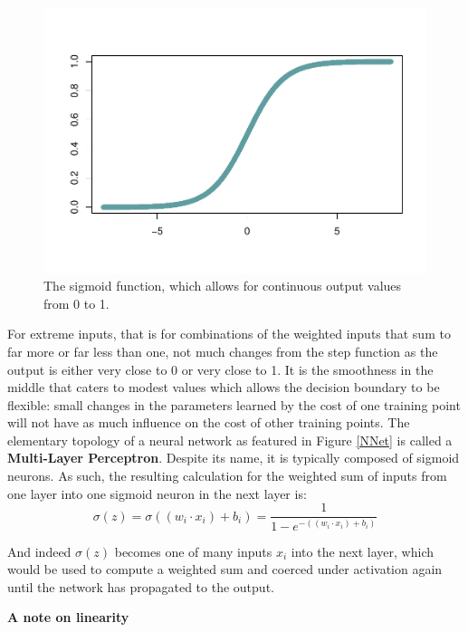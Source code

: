 \begin{figure}[H]
    \centering
   \vspace{-40pt}
    \includegraphics[width = .7\textwidth]{Figures/sigmoid-function-1.pdf}
   \vspace{-40pt}
    \caption{\footnotesize The sigmoid function, which allows for continuous output values from 0 to 1.}
\end{figure}

For extreme inputs, that is for combinations of the weighted inputs that sum to far more or far less than one, not much changes from the step function as the output is either very close to 0 or very close to 1.  It is the smoothness in the middle that caters to modest values which allows the decision boundary to be flexible: small changes in the parameters learned by the cost of one training point will not have as much influence on the cost of other training points.
The elementary topology of a neural network as featured in Figure \ref{NNet} is called a \textbf{Multi-Layer Perceptron}.  Despite its name, it is typically composed of sigmoid neurons.  As such, the resulting calculation for the weighted sum of inputs from one layer into one sigmoid neuron in the next layer is:
$$
\sigma(z) = \sigma((w_i \cdot x_i) + b_i) = \frac{1}{1-e^{-((w_i \cdot x_i) + b_i)}}
$$

And indeed $\sigma(z)$ becomes one of many inputs $x_i$ into the next layer, which would be used to compute a weighted sum and coerced under activation again until the network has propagated to the output.








\textbf{A note on linearity}


